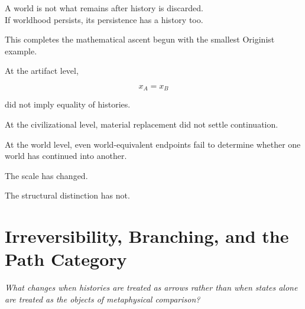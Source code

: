 \documentclass[
  11pt,
  a4paper,
  DIV=12,
  BCOR=0mm,
  parskip=half-
]{scrartcl}
\theoremstyle{definition}
\theoremstyle{plain}
\theoremstyle{remark}
\newcommand{\movementquestion}[1]{%
  \begin{center}
    \small\itshape
    #1
  \end{center}
  \medskip
}
\begin{document}
\begin{held}
\centering
A world is not what remains after history is discarded.\\[3pt]
If worldhood persists, its persistence has a history too.
\end{held}

This completes the mathematical ascent begun with the smallest Originist
example.

At the artifact level,

\[
  x_A=x_B
\]

did not imply equality of histories.

At the civilizational level, material replacement did not settle
continuation.

At the world level, even world-equivalent endpoints fail to determine whether
one world has continued into another.

The scale has changed.

The structural distinction has not.


\section{Irreversibility, Branching, and the Path Category}
\label{app:path-category}

\movementquestion{What changes when histories are treated as arrows rather than when states alone are treated as the objects of metaphysical comparison?}
\end{document}
